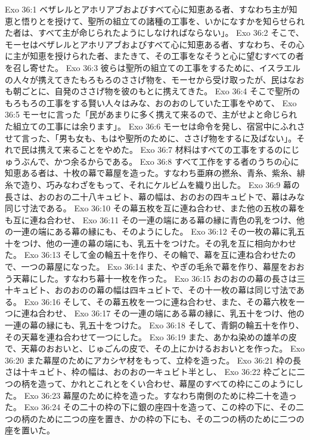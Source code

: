 Exo 36:1  ベザレルとアホリアブおよびすべて心に知恵ある者、すなわち主が知恵と悟りとを授けて、聖所の組立ての諸種の工事を、いかになすかを知らせられた者は、すべて主が命じられたようにしなければならない」。
Exo 36:2  そこで、モーセはベザレルとアホリアブおよびすべて心に知恵ある者、すなわち、その心に主が知恵を授けられた者、またきて、その工事をなそうと心に望むすべての者を召し寄せた。
Exo 36:3  彼らは聖所の組立ての工事をするために、イスラエルの人々が携えてきたもろもろのささげ物を、モーセから受け取ったが、民はなおも朝ごとに、自発のささげ物を彼のもとに携えてきた。
Exo 36:4  そこで聖所のもろもろの工事をする賢い人々はみな、おのおのしていた工事をやめて、
Exo 36:5  モーセに言った「民があまりに多く携えて来るので、主がせよと命じられた組立ての工事には余ります」。
Exo 36:6  モーセは命令を発し、宿営中にふれさせて言った、「男も女も、もはや聖所のために、ささげ物をするに及ばない」。それで民は携えて来ることをやめた。
Exo 36:7  材料はすべての工事をするのにじゅうぶんで、かつ余るからである。
Exo 36:8  すべて工作をする者のうちの心に知恵ある者は、十枚の幕で幕屋を造った。すなわち亜麻の撚糸、青糸、紫糸、緋糸で造り、巧みなわざをもって、それにケルビムを織り出した。
Exo 36:9  幕の長さは、おのおの二十八キュビト、幕の幅は、おのおの四キュビトで、幕はみな同じ寸法である。
Exo 36:10  その幕五枚を互に連ね合わせ、また他の五枚の幕をも互に連ね合わせ、
Exo 36:11  その一連の端にある幕の縁に青色の乳をつけ、他の一連の端にある幕の縁にも、そのようにした。
Exo 36:12  その一枚の幕に乳五十をつけ、他の一連の幕の端にも、乳五十をつけた。その乳を互に相向かわせた。
Exo 36:13  そして金の輪五十を作り、その輪で、幕を互に連ね合わせたので、一つの幕屋になった。
Exo 36:14  また、やぎの毛糸で幕を作り、幕屋をおおう天幕にした。すなわち幕十一枚を作った。
Exo 36:15  おのおのの幕の長さは三十キュビト、おのおのの幕の幅は四キュビトで、その十一枚の幕は同じ寸法である。
Exo 36:16  そして、その幕五枚を一つに連ね合わせ、また、その幕六枚を一つに連ね合わせ、
Exo 36:17  その一連の端にある幕の縁に、乳五十をつけ、他の一連の幕の縁にも、乳五十をつけた。
Exo 36:18  そして、青銅の輪五十を作り、その天幕を連ね合わせて一つにした。
Exo 36:19  また、あかね染めの雄羊の皮で、天幕のおおいと、じゅごんの皮で、その上にかけるおおいとを作った。
Exo 36:20  また幕屋のためにアカシヤ材をもって、立枠を造った。
Exo 36:21  枠の長さは十キュビト、枠の幅は、おのおの一キュビト半とし、
Exo 36:22  枠ごとに二つの柄を造って、かれとこれとをくい合わせ、幕屋のすべての枠にこのようにした。
Exo 36:23  幕屋のために枠を造った。すなわち南側のために枠二十を造った。
Exo 36:24  その二十の枠の下に銀の座四十を造って、この枠の下に、その二つの柄のために二つの座を置き、かの枠の下にも、その二つの柄のために二つの座を置いた。
